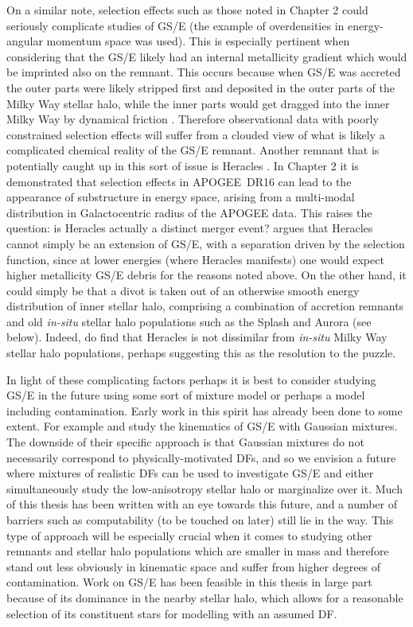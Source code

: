 On a similar note, selection effects such as those noted in Chapter 2 could seriously complicate studies of GS/E (the example of overdensities in energy-angular momentum space was used). This is especially pertinent when considering that the GS/E likely had an internal metallicity gradient which would be imprinted also on the remnant. This occurs because when GS/E was accreted the outer parts were likely stripped first and deposited in the outer parts of the Milky Way stellar halo, while the inner parts would get dragged into the inner Milky Way by dynamical friction \parencite[e.g. see ][]{amarante22,vasiliev22}. Therefore observational data with poorly constrained selection effects will suffer from a clouded view of what is likely a complicated chemical reality of the GS/E remnant. Another remnant that is potentially caught up in this sort of issue is Heracles \parencite{horta21a}. In Chapter 2 it is demonstrated that selection effects in APOGEE~DR16 can lead to the appearance of substructure in energy space, arising from a multi-modal distribution in Galactocentric radius of the APOGEE data. This raises the question: is Heracles actually a distinct merger event? \textcite{amarante22} argues that Heracles cannot simply be an extension of GS/E, with a separation driven by the selection function, since at lower energies (where Heracles manifests) one would expect higher metallicity GS/E debris for the reasons noted above. On the other hand, it could simply be that a divot is taken out  of an otherwise smooth energy distribution of inner stellar halo, comprising a combination of accretion remnants and old \textit{in-situ} stellar halo populations such as the Splash and Aurora (see below). Indeed, \textcite{horta23a} do find that Heracles is not dissimilar from \textit{in-situ} Milky Way stellar halo populations, perhaps suggesting this as the resolution to the puzzle.

In light of these complicating factors perhaps it is best to consider studying GS/E in the future using some sort of mixture model or perhaps a model including contamination. Early work in this spirit has already been done to some extent. For example \textcite{lancaster19} and \textcite{iorio21} study the kinematics of GS/E with Gaussian mixtures. The downside of their specific approach is that Gaussian mixtures do not necessarily correspond to physically-motivated DFs, and so we envision a future where mixtures of realistic DFs can be used to investigate GS/E and either simultaneously study the low-anisotropy stellar halo or marginalize over it. Much of this thesis has been written with an eye towards this future, and a number of barriers such as computability (to be touched on later) still lie in the way. This type of approach will be especially crucial when it comes to studying other remnants and stellar halo populations which are smaller in mass and therefore stand out less obviously in kinematic space and suffer from higher degrees of contamination. Work on GS/E has been feasible in this thesis in large part because of its dominance in the nearby stellar halo, which allows for a reasonable selection of its constituent stars for modelling with an assumed DF.


